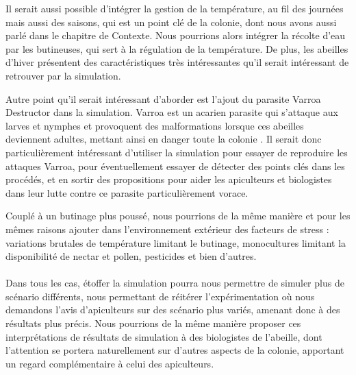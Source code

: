 	Il serait aussi possible d'intégrer la gestion de la température, au fil des journées mais aussi des saisons, qui est un point clé de la colonie, dont nous avons aussi parlé dans le chapitre de Contexte. Nous pourrions alors intégrer la récolte d'eau par les butineuses, qui sert à la régulation de la température. De plus, les abeilles d'hiver présentent des caractéristiques très intéressantes qu'il serait intéressant de retrouver par la simulation. 
	
	Autre point qu'il serait intéressant d'aborder est l'ajout du parasite Varroa Destructor dans la simulation. Varroa est un acarien parasite qui s'attaque aux larves et nymphes et provoquent des malformations lorsque ces abeilles deviennent adultes, mettant ainsi en danger toute la colonie \cite{le_conte_varroa_2010}. Il serait donc particulièrement intéressant d'utiliser la simulation pour essayer de reproduire les attaques Varroa, pour éventuellement essayer de détecter des points clés dans les procédés, et en sortir des propositions pour aider les apiculteurs et biologistes dans leur lutte contre ce parasite particulièrement vorace.
	
	Couplé à un butinage plus poussé, nous pourrions de la même manière et pour les mêmes raisons ajouter dans l'environnement extérieur des facteurs de stress : variations brutales de température limitant le butinage, monocultures limitant la disponibilité de nectar et pollen, pesticides et bien d'autres.
	
	\paragraph{}
	Dans tous les cas, étoffer la simulation pourra nous permettre de simuler plus de scénario différents, nous permettant de réitérer l'expérimentation où nous demandons l'avis d'apiculteurs sur des scénario plus variés, amenant donc à des résultats plus précis. Nous pourrions de la même manière proposer ces interprétations de résultats de simulation à des biologistes de l'abeille, dont l'attention se portera naturellement sur d'autres aspects de la colonie, apportant un regard complémentaire à celui des apiculteurs.
	
	
			
